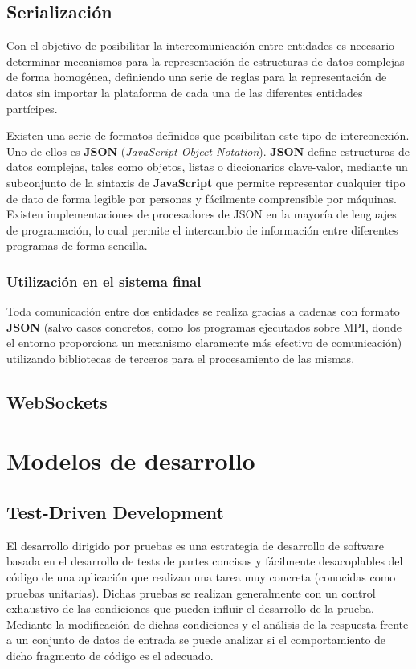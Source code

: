 \subsection{Serialización}
\label{seralization}
Con el objetivo de posibilitar la intercomunicación entre entidades es necesario determinar mecanismos para la representación de estructuras de datos complejas de forma homogénea, definiendo una serie de reglas para la representación de datos sin importar la plataforma de cada una de las diferentes entidades partícipes.

Existen una serie de formatos definidos que posibilitan este tipo de interconexión. Uno de ellos es \textbf{JSON} (\textit{JavaScript Object Notation})\cite{rfc7159}. \textbf{JSON} define estructuras de datos complejas, tales como objetos, listas o diccionarios clave-valor, mediante un subconjunto de la sintaxis de \textbf{JavaScript} que permite representar cualquier tipo de dato de forma legible por personas y fácilmente comprensible por máquinas. Existen implementaciones de procesadores de JSON en la mayoría de lenguajes de programación, lo cual permite el intercambio de información entre diferentes programas de forma sencilla.

\subsubsection{Utilización en el sistema final}

Toda comunicación entre dos entidades se realiza gracias a cadenas con formato \textbf{JSON} (salvo casos concretos, como los programas ejecutados sobre MPI, donde el entorno proporciona un mecanismo claramente más efectivo de comunicación) utilizando bibliotecas de terceros para el procesamiento de las mismas.

\subsection{WebSockets}

\section{Modelos de desarrollo}
\subsection{Test-Driven Development}
\label{tdd}

El desarrollo dirigido por pruebas es una estrategia de desarrollo de software basada en el desarrollo de tests de partes concisas y fácilmente desacoplables del código de una aplicación que realizan una tarea muy concreta (conocidas como pruebas unitarias). Dichas pruebas se realizan generalmente con un control exhaustivo de las condiciones que pueden influir el desarrollo de la prueba. Mediante la modificación de dichas condiciones y el análisis de la respuesta frente a un conjunto de datos de entrada se puede analizar si el comportamiento de dicho fragmento de código es el adecuado.

